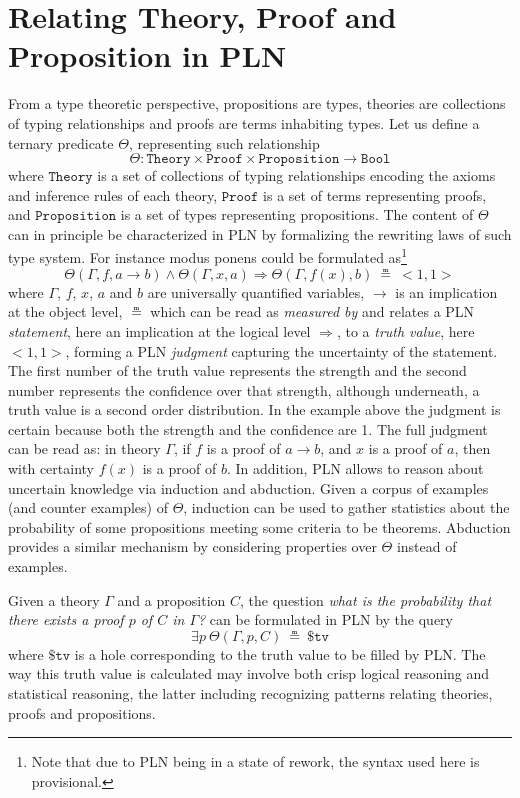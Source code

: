 \documentclass{easychair}
\newcommand{\Theory}{\texttt{Theory}}
\newcommand{\Proof}{\texttt{Proof}}
\newcommand{\Proposition}{\texttt{Proposition}}
\newcommand{\Bool}{\texttt{Bool}}
\newcommand{\arrow}{\to}
\newcommand{\limp}{\Rightarrow}
\newcommand{\STV}[2]{<\!#1, #2\!>}
\begin{document}
\section{Relating Theory, Proof and Proposition in PLN}

From a type theoretic perspective, propositions are types, theories
are collections of typing relationships and proofs are terms
inhabiting types.  Let us define a ternary predicate $\Theta$,
representing such relationship
$$\Theta : \Theory \times \Proof \times \Proposition \arrow \Bool$$
where $\Theory$ is a set of collections of typing relationships
encoding the axioms and inference rules of each theory, $\Proof$ is a
set of terms representing proofs, and $\Proposition$ is a set of types
representing propositions.  The content of $\Theta$ can in principle
be characterized in PLN by formalizing the rewriting laws of such type
system.  For instance modus ponens could be formulated
as\footnote{Note that due to PLN being in a state of rework, the
syntax used here is provisional.}
$$\Theta(\Gamma, f, a \to b) \land \Theta(\Gamma, x, a) \limp
\Theta(\Gamma, f(x), b)\ \measeq\ \STV{1}{1}$$ where $\Gamma$, $f$,
$x$, $a$ and $b$ are universally quantified variables, $\to$ is an
implication at the object level, $\measeq$ which can be read as
\emph{measured by} and relates a PLN \emph{statement}, here an
implication at the logical level $\limp$, to a \emph{truth value},
here $\STV{1}{1}$, forming a PLN \emph{judgment} capturing the
uncertainty of the statement.  The first number of the truth value
represents the strength and the second number represents the
confidence over that strength, although underneath, a truth value is a
second order distribution.  In the example above the judgment is
certain because both the strength and the confidence are 1.  The full
judgment can be read as: in theory $\Gamma$, if $f$ is a proof of $a
\arrow b$, and $x$ is a proof of $a$, then with certainty $f(x)$ is a
proof of $b$.  In addition, PLN allows to reason about uncertain
knowledge via induction and abduction.  Given a corpus of examples
(and counter examples) of $\Theta$, induction can be used to gather
statistics about the probability of some propositions meeting some
criteria to be theorems.  Abduction provides a similar mechanism by
considering properties over $\Theta$ instead of examples.

Given a theory $\Gamma$ and a proposition $C$, the question \emph{what
is the probability that there exists a proof $p$ of $C$ in $\Gamma$?}
can be formulated in PLN by the query
$$\exists p\ \Theta(\Gamma, p, C)\ \measeq\ \$\texttt{tv}$$ where
$\$\texttt{tv}$ is a hole corresponding to the truth value to be
filled by PLN.  The way this truth value is calculated may involve
both crisp logical reasoning and statistical reasoning, the latter
including recognizing patterns relating theories, proofs and
propositions.
\end{document}
